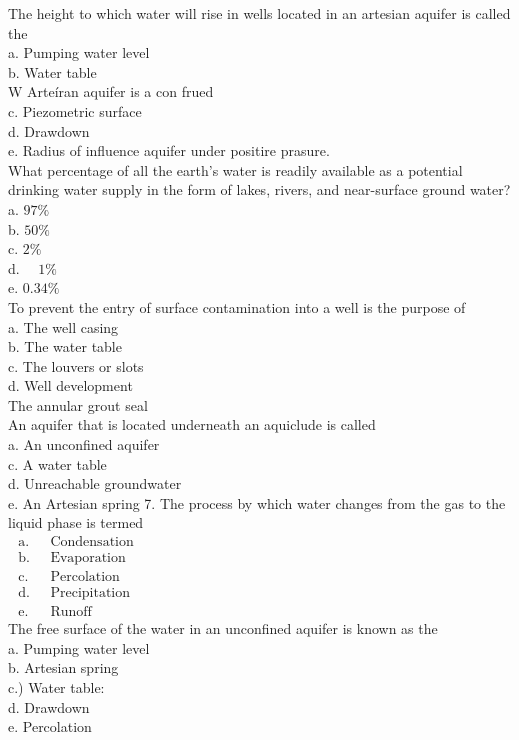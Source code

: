 The height to which water will rise in wells located in an artesian aquifer is called the\\
a. Pumping water level\\
b. Water table\\
W Arteíran aquifer is a con frued\\
c. Piezometric surface\\
d. Drawdown\\
e. Radius of influence aquifer under positire prasure.\\

What percentage of all the earth's water is readily available as a potential drinking water supply in the form of lakes, rivers, and near-surface ground water?\\
a. $97 \%$\\
b. $50 \%$\\
c. $2 \%$\\
d. $\quad 1 \%$\\
e. $0.34 \%$\\

To prevent the entry of surface contamination into a well is the purpose of\\
a. The well casing\\
b. The water table\\
c. The louvers or slots\\
d. Well development\\
The annular grout seal\\

An aquifer that is located underneath an aquiclude is called\\
a. An unconfined aquifer\\
c. A water table\\
d. Unreachable groundwater\\
e. An Artesian spring 7. The process by which water changes from the gas to the liquid phase is termed\\
$\begin{array}{ll}\text { a.  } & \text { Condensation } \\ \text { b. } & \text { Evaporation } \\ \text { c. } & \text { Percolation } \\ \text { d. } & \text { Precipitation } \\ \text { e. } & \text { Runoff }\end{array}$\\

The free surface of the water in an unconfined aquifer is known as the\\
a. Pumping water level\\
b. Artesian spring\\
c.) Water table:\\
d. Drawdown\\
e. Percolation\\

